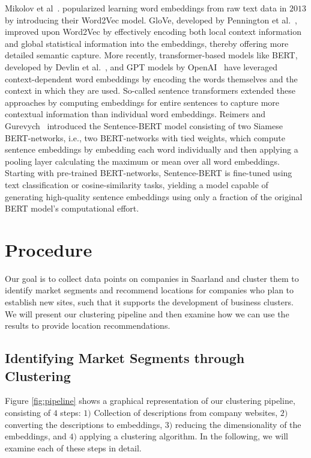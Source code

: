 \documentclass[conference]{IEEEtran}
\begin{document}
Mikolov et al~\cite{mikolov2013efficient}. popularized learning word embeddings from raw text data in $2013$ by introducing their Word2Vec model. GloVe, developed by Pennington et al.~\cite{pennington2014glove}, improved upon Word2Vec by effectively encoding both local context information and global statistical information into the embeddings, thereby offering more detailed semantic capture. More recently, transformer-based models like BERT, developed by Devlin et al.~\cite{devlin2018bert}, and GPT models by OpenAI~\cite{radford2018improving} have leveraged context-dependent word embeddings by encoding the words themselves and the context in which they are used. So-called sentence transformers extended these approaches by computing embeddings for entire sentences to capture more contextual information than individual word embeddings. Reimers and Gurevych~\cite{reimers2019sentence} introduced the Sentence-BERT model consisting of two Siamese BERT-networks, i.e., two BERT-networks with tied weights, which compute sentence embeddings by embedding each word individually and then applying a pooling layer calculating the maximum or mean over all word embeddings. Starting with pre-trained BERT-networks, Sentence-BERT is fine-tuned using text classification or cosine-similarity tasks, yielding a model capable of generating high-quality sentence embeddings using only a fraction of the original BERT model's computational effort.

\section{Procedure}


Our goal is to collect data points on companies in Saarland and cluster them to identify market segments and recommend locations for companies who plan to establish new sites, such that it supports the development of business clusters. We will present our clustering pipeline and then examine how we can use the results to provide location recommendations. 

\subsection{Identifying Market Segments through Clustering}
Figure \ref{fig:pipeline} shows a graphical representation of our clustering pipeline, consisting of $4$ steps: $1)$ Collection of descriptions from company websites, $2)$ converting the descriptions to embeddings, $3)$ reducing the dimensionality of the embeddings, and $4)$ applying a clustering algorithm. In the following, we will examine each of these steps in detail.
\end{document}
